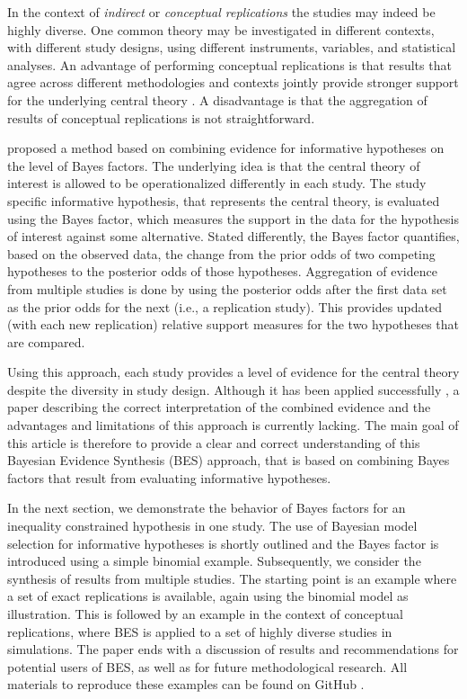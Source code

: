 \documentclass[11pt,reqno]{article}
\begin{document}
In the context of \textit{indirect} or \textit{conceptual replications} the studies may indeed be highly diverse. One common theory may be investigated in different contexts, with different study designs, using different instruments, variables, and statistical analyses. An advantage of performing conceptual replications is that results that agree across different methodologies and contexts jointly provide stronger support for the underlying central theory \autocite{crandall_conceptual_2016, lawlor_triangulation_2017, nosek_scientific_2012}. A disadvantage is that the aggregation of results of conceptual replications is not straightforward.

\textcite{kuiper_combining_2013} proposed a method based on combining evidence for informative hypotheses on the level of Bayes factors. The underlying idea is that the central theory of interest is allowed to be operationalized differently in each study. The study specific informative hypothesis, that represents the central theory, is evaluated using the Bayes factor, which measures the support in the data for the hypothesis of interest against some alternative. Stated differently, the Bayes factor quantifies, based on the observed data, the change from the prior odds of two competing hypotheses to the posterior odds of those hypotheses. Aggregation of evidence from multiple studies is done by using the posterior odds after the first data set as the prior odds for the next (i.e., a replication study). This provides updated (with each new replication) relative support measures for the two hypotheses that are compared.

Using this approach, each study provides a level of evidence for the central theory despite the diversity in study design. Although it has been applied successfully \autocite{zondervan_parental_2019, zondervan_robust_2020, kevenaar_bes_2021, volker_cooperation_2022}, a paper describing the correct interpretation of the combined evidence and the advantages and limitations of this approach is currently lacking. The main goal of this article is therefore to provide a clear and correct understanding of this Bayesian Evidence Synthesis (BES) approach, that is based on combining Bayes factors that result from evaluating informative hypotheses.

In the next section, we demonstrate the behavior of Bayes factors for an inequality constrained hypothesis in one study. The use of Bayesian model selection for informative hypotheses is shortly outlined and the Bayes factor is introduced using a simple binomial example. Subsequently, we consider the synthesis of results from multiple studies. The starting point is an example where a set of exact replications is available, again using the binomial model as illustration. This is followed by an example in the context of conceptual replications, where BES is applied to a set of highly diverse studies in simulations. The paper ends with a discussion of results and recommendations for potential users of BES, as well as for future methodological research. All materials to reproduce these examples can be found on GitHub \autocite{klugkist_bes_materials}.
\end{document}
